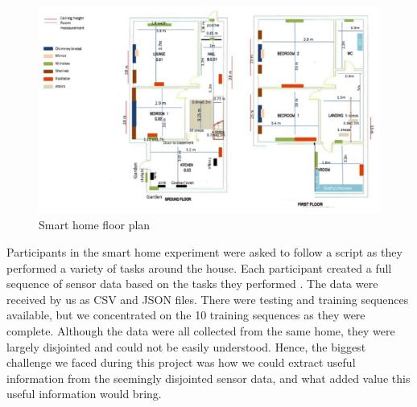 \documentclass[fleqn,10pt]{SelfArx} %
\begin{document}
\begin{figure}[!h] \centering
	\includegraphics[scale=0.6]{floorplan} 
	\caption{Smart home floor plan \cite{sphere2016}}
	\label{fig:floorplan}
\end{figure}

Participants in the smart home experiment were asked to follow a script as they performed a variety of tasks around the house. Each participant created a full sequence of sensor data based on the tasks they performed \cite{sphere2016}. The data were received by us as CSV and JSON files. There were testing and training sequences available, but we concentrated on the 10 training sequences as they were complete. Although the data were all collected from the same home, they were largely disjointed and could not be easily understood. Hence, the biggest challenge we faced during this project was how we could extract useful information from the seemingly disjointed sensor data, and what added value this useful information would bring.  \\
\end{document}
